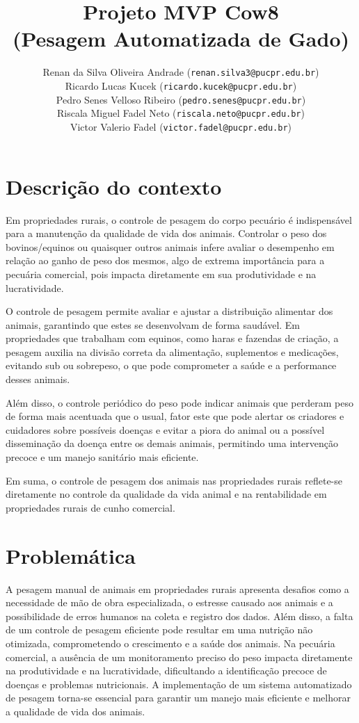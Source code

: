 \documentclass[11pt]{article}
\title{\textbf{Projeto MVP Cow8\\(Pesagem Automatizada de Gado)}}
\author{
    Renan da Silva Oliveira Andrade (\texttt{renan.silva3@pucpr.edu.br})\\
    Ricardo Lucas Kucek (\texttt{ricardo.kucek@pucpr.edu.br})\\
    Pedro Senes Velloso Ribeiro (\texttt{pedro.senes@pucpr.edu.br})\\ 
    Riscala Miguel Fadel Neto (\texttt{riscala.neto@pucpr.edu.br})\\
    Victor Valerio Fadel (\texttt{victor.fadel@pucpr.edu.br})
}
\begin{document}
\maketitle

\section{Descrição do contexto}

Em propriedades rurais, o controle de pesagem do corpo pecuário é indispensável para a manutenção da qualidade de vida dos animais. Controlar o peso dos bovinos/equinos ou quaisquer outros animais infere avaliar o desempenho em relação ao ganho de peso dos mesmos, algo de extrema importância para a pecuária comercial, pois impacta diretamente em sua produtividade e na lucratividade.

O controle de pesagem permite avaliar e ajustar a distribuição alimentar dos animais, garantindo que estes se desenvolvam de forma saudável. Em propriedades que trabalham com equinos, como haras e fazendas de criação, a pesagem auxilia na divisão correta da alimentação, suplementos e medicações, evitando sub ou sobrepeso, o que pode comprometer a saúde e a performance desses animais.

Além disso, o controle periódico do peso pode indicar animais que perderam peso de forma mais acentuada que o usual, fator este que pode alertar os criadores e cuidadores sobre possíveis doenças e evitar a piora do animal ou a possível disseminação da doença entre os demais animais, permitindo uma intervenção precoce e um manejo sanitário mais eficiente.

Em suma, o controle de pesagem dos animais nas propriedades rurais reflete-se diretamente no controle da qualidade da vida animal e na rentabilidade em propriedades rurais de cunho comercial.

\section{Problemática}
A pesagem manual de animais em propriedades rurais apresenta desafios como a necessidade de mão de obra especializada,
o estresse causado aos animais e a possibilidade de erros humanos na coleta e registro dos dados.
Além disso, a falta de um controle de pesagem eficiente pode resultar em uma nutrição não otimizada,
comprometendo o crescimento e a saúde dos animais. Na pecuária comercial,
a ausência de um monitoramento preciso do peso impacta diretamente na produtividade e na lucratividade,
dificultando a identificação precoce de doenças e problemas nutricionais.
A implementação de um sistema automatizado de pesagem torna-se essencial para garantir um manejo mais eficiente e melhorar a qualidade de vida dos animais.
\end{document}
